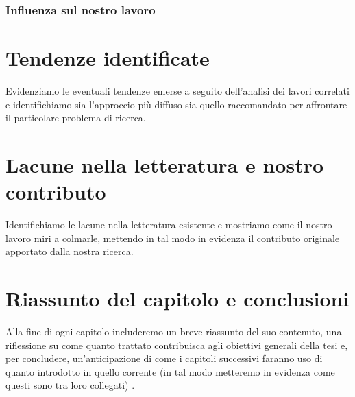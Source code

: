 \subsubsection{Influenza sul nostro lavoro}

\section{Tendenze identificate}

Evidenziamo le eventuali tendenze emerse a seguito dell'analisi dei lavori correlati e identifichiamo sia l'approccio più diffuso sia quello raccomandato per affrontare il particolare problema di ricerca.

\section{Lacune nella letteratura e nostro contributo}

Identifichiamo le lacune nella letteratura esistente e mostriamo come il nostro lavoro miri a colmarle, mettendo in tal modo in evidenza il contributo originale apportato dalla nostra ricerca.

\section{Riassunto del capitolo e conclusioni}

Alla fine di ogni capitolo includeremo un breve riassunto del suo contenuto, una riflessione su come quanto trattato contribuisca agli obiettivi generali della tesi e, per concludere, un'anticipazione di come i capitoli successivi faranno uso di quanto introdotto in quello corrente (in tal modo metteremo in evidenza come questi sono tra loro collegati) \cite{zobel2015writing}.
